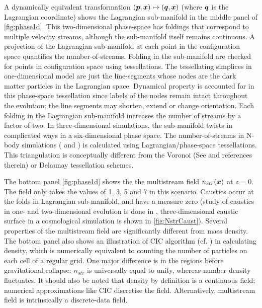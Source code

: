 \documentclass[fleqn,usenatbib,useAMS]{mnras}
\begin{document}
 
A dynamically equivalent transformation $(\bmath{p}, \bmath{x}) \mapsto (\bmath{q}, \bmath{x}) $ (where $\bmath{q}$ is the Lagrangian coordinate) shows the Lagrangian sub-manifold in the middle panel of \autoref{fig:phase1d}. This two-dimensional phase-space has foldings that correspond to multiple velocity streams, although the sub-manifold itself remains continuous. A projection of the Lagrangian sub-manifold at each point in the configuration space quantifies the number-of-streams. Folding in the sub-manifold are checked for points in configuration space using tessellations. The tessellating simplices in one-dimensional model are just the line-segments whose nodes are the dark matter particles in the Lagrangian space. Dynamical property is accounted for in this phase-space tessellation since labels of the nodes remain intact throughout the evolution; the line segments may shorten, extend or change orientation. Each folding in the Lagrangian sub-manifold increases the number of streams by a factor of two. In three-dimensional simulations, the sub-manifold twists in complicated ways in a six-dimensional phase space. The number-of-streams in N-body simulations (\citealt{Shandarin2012} and \citealt{Abel2012b}) is calculated using Lagrangian/phase-space tessellations. This triangulation is conceptually different from the Voronoi (See \citealt{Schaap2000} and references therein) or Delaunay \citep{Icke1991} tessellation schemes. 

The bottom panel \autoref{fig:phase1d} shows the the multistream field $n_{str}(\bmath{x})$ at $z = 0$. The field only takes the values of 1, 3, 5 and 7 in this scenario. Caustics occur at the folds in Lagrangian sub-manifold, and have a measure zero (study of caustics in one- and  two-dimensional evolution is done in \cite{Hidding2014}, three-dimensional caustic surface in a cosmological simulation is shown in \autoref{fig:NstrCaust}). Several properties of the multistream field are significantly different from mass density. The bottom panel also shows an illustration of CIC algorithm (cf. \citealt{Hockney1988}) in calculating density, which is numerically equivalent to counting the number of particles on each cell of a regular grid. One major difference is in the regions before gravitational collapse: $n_{str}$ is universally equal to unity, whereas number density fluctuates. It should also be noted that density by definition is a continuous field; numerical approximations like CIC discretise the field. Alternatively, multistream field is intrinsically a discrete-data field.  
\end{document}
